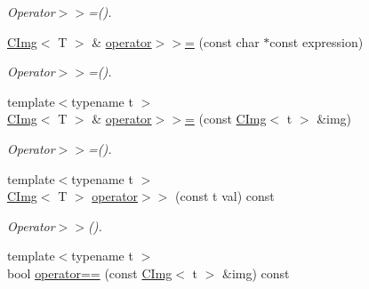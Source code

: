 \begin{DoxyCompactItemize}
\begin{DoxyCompactList}\small\item\em Operator$>$$>$=(). \item\end{DoxyCompactList}\item 
\hypertarget{structcimg__library_1_1CImg_aea3931599aa0ed54a4dfb1891db99c25}{
\hyperlink{structcimg__library_1_1CImg}{CImg}$<$ T $>$ \& \hyperlink{structcimg__library_1_1CImg_aea3931599aa0ed54a4dfb1891db99c25}{operator$>$$>$=} (const char $\ast$const expression)}
\label{structcimg__library_1_1CImg_aea3931599aa0ed54a4dfb1891db99c25}

\begin{DoxyCompactList}\small\item\em Operator$>$$>$=(). \item\end{DoxyCompactList}\item 
\hypertarget{structcimg__library_1_1CImg_abfb262297f3763d16b4a4195ca238eb5}{
{\footnotesize template$<$typename t $>$ }\\\hyperlink{structcimg__library_1_1CImg}{CImg}$<$ T $>$ \& \hyperlink{structcimg__library_1_1CImg_abfb262297f3763d16b4a4195ca238eb5}{operator$>$$>$=} (const \hyperlink{structcimg__library_1_1CImg}{CImg}$<$ t $>$ \&img)}
\label{structcimg__library_1_1CImg_abfb262297f3763d16b4a4195ca238eb5}

\begin{DoxyCompactList}\small\item\em Operator$>$$>$=(). \item\end{DoxyCompactList}\item 
\hypertarget{structcimg__library_1_1CImg_ae643331037bdf4707f160e8a05e8f5e8}{
{\footnotesize template$<$typename t $>$ }\\\hyperlink{structcimg__library_1_1CImg}{CImg}$<$ T $>$ \hyperlink{structcimg__library_1_1CImg_ae643331037bdf4707f160e8a05e8f5e8}{operator$>$$>$} (const t val) const }
\label{structcimg__library_1_1CImg_ae643331037bdf4707f160e8a05e8f5e8}

\begin{DoxyCompactList}\small\item\em Operator$>$$>$(). \item\end{DoxyCompactList}\item 
\hypertarget{structcimg__library_1_1CImg_a0ad220d8708e61416b9b9255aa612740}{
{\footnotesize template$<$typename t $>$ }\\bool \hyperlink{structcimg__library_1_1CImg_a0ad220d8708e61416b9b9255aa612740}{operator==} (const \hyperlink{structcimg__library_1_1CImg}{CImg}$<$ t $>$ \&img) const }
\label{structcimg__library_1_1CImg_a0ad220d8708e61416b9b9255aa612740}


\end{DoxyCompactItemize}
